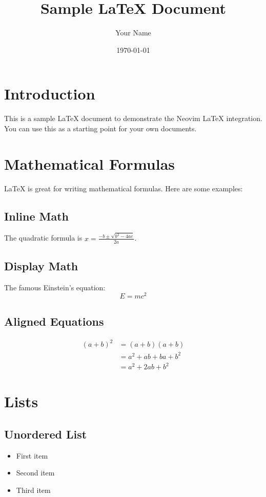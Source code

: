 \documentclass{article}
\title{Sample \LaTeX{} Document}
\author{Your Name}
\date{\today}
\begin{document}
\maketitle

\section{Introduction}
This is a sample \LaTeX{} document to demonstrate the Neovim \LaTeX{} integration. You can use this as a starting point for your own documents.

\section{Mathematical Formulas}
\LaTeX{} is great for writing mathematical formulas. Here are some examples:

\subsection{Inline Math}
The quadratic formula is $x = \frac{-b \pm \sqrt{b^2 - 4ac}}{2a}$.

\subsection{Display Math}
The famous Einstein's equation:
\begin{equation}
    E = mc^2
    \label{eq:einstein}
\end{equation}

\subsection{Aligned Equations}
\begin{align}
    (a+b)^2 &= (a+b)(a+b) \\
    &= a^2 + ab + ba + b^2 \\
    &= a^2 + 2ab + b^2
\end{align}

\section{Lists}

\subsection{Unordered List}
\begin{itemize}
    \item First item
    \item Second item
    \item Third item
\end{itemize}
\end{document}
